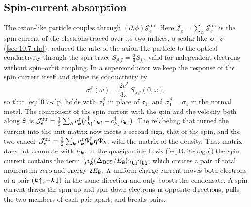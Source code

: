 \subsection{Spin-current absorption}\label{sec:15.4-spin}

The axion-like particle couples through $(\partial_t\phi)\mathcal{J}^{\alpha\alpha}_e$. Here $\mathcal{J}_e = \sum_\alpha\mathcal{J}^{\alpha\alpha}_e$ is the spin current of the electrons traced over its two indices, a scalar like $\boldsymbol{\sigma}\cdot\bm{v}$ (\cref{sec:10.7-alp}).  reduced the rate of the axion-like particle to the optical conductivity through the spin trace $S_{\mathcal{J}\mathcal{J}} = \frac34S_{jj}$, valid for independent electrons without spin--orbit coupling. In a superconductor we keep the response of the spin current itself and define its conductivity by
\begin{equation}
  \sigma_1^{\mathcal{J}}(\omega) = \frac{2e^2}{3\omega}\,S_{\mathcal{J}\mathcal{J}}(0,\omega) ,
  \label{eq:15.4-sJdef}
\end{equation}
so that \cref{eq:10.7-alp} holds with $\sigma_1^{\mathcal{J}}$ in place of $\sigma_1$, and $\sigma_1^{\mathcal{J}} = \sigma_1$ in the normal metal. The component of the spin current with the spin and the velocity both along $\hat{\bm{z}}$ is $\mathcal{J}^{zz}_e = \frac12\sum_{\bm{k}}v^z_{\bm{k}}(c^\dagger_{\bm{k}\uparrow}c_{\bm{k}\uparrow} - c^\dagger_{\bm{k}\downarrow}c_{\bm{k}\downarrow})$. The relabeling that turned the current into the unit matrix now meets a second sign, that of the spin, and the two cancel: $\mathcal{J}^{zz}_e = \frac12\sum_{\bm{k}}v^z_{\bm{k}}\Psi^\dagger_{\bm{k}}\boldsymbol{\eta}\Psi_{\bm{k}}$, with the matrix of the density. That matrix does not commute with $h_{\bm{k}}$. In the quasiparticle basis (\cref{eq:D.40-bogo}) the spin current contains the term $\frac12v^z_{\bm{k}}(\Delta_{\mathrm{BCS}}/E_{\bm{k}})\gamma^\dagger_{\bm{k}1}\gamma^\dagger_{\bm{k}2}$, which creates a pair of total momentum zero and energy $2E_{\bm{k}}$. A uniform charge current moves both electrons of a pair $(\bm{k}\!\uparrow, -\bm{k}\!\downarrow)$ in the same direction and only boosts the condensate. A spin current drives the spin-up and spin-down electrons in opposite directions, pulls the two members of each pair apart, and breaks pairs.

